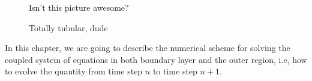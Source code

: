 

\begin{figure}
  \centering
  
  \caption[Awesome picture]{Isn't this picture awesome?}
\end{figure}

\begin{figure}
  \centering
  
  \caption[Tubular picture]{Totally tubular, dude}
\end{figure}


In this chapter, we are going to describe the numerical scheme for solving the coupled system of equations in both boundary layer and the outer region, i.e, how to evolve the quantity from time step $n$ to time step $n+1$.


